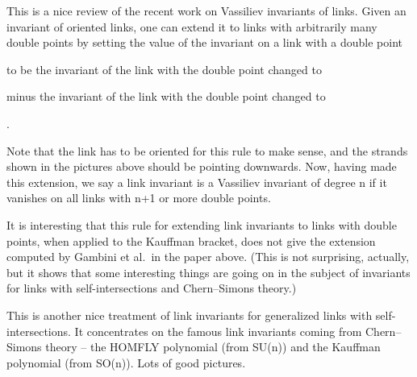 
This is a nice review of the recent work on Vassiliev invariants of links. Given an invariant of oriented links, one can extend it to links with arbitrarily many double points by setting the value of the invariant on a link with a double point
\begin{center}
\end{center}
to be the invariant of the link with the double point changed to
\begin{center}
\end{center}
minus the invariant of the link with the double point changed to
\begin{center}
.
\end{center}
Note that the link has to be oriented for this rule to make sense, and the strands shown in the pictures above should be pointing downwards. Now, having made this extension, we say a link invariant is a Vassiliev invariant of degree n if it vanishes on all links with n+1 or more double points.

It is interesting that this rule for extending link invariants to links with double points, when applied to the Kauffman bracket, does not give the extension computed by Gambini et al.\ in the paper above. (This is not surprising, actually, but it shows that some interesting things are going on in the subject of invariants for links with self-intersections and Chern--Simons theory.)


This is another nice treatment of link invariants for generalized links with self-intersections. It concentrates on the famous link invariants coming from Chern--Simons theory -- the HOMFLY polynomial (from SU(n)) and the Kauffman polynomial (from SO(n)). Lots of good pictures.

